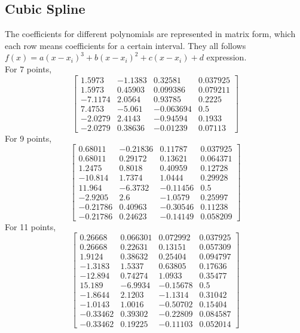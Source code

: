 \documentclass{article}
\newcommand{\bmat}[1]{\begin{bmatrix} #1 \end{bmatrix}}
\begin{document}
\subsection*{Cubic Spline}
The coefficients for different polynomials are represented in matrix form, which each row means coefficients for a certain interval. 
They all follows $f(x) = a(x-x_i)^3 + b(x-x_i)^2 + c(x-x_i) + d$ expression.
\\
For 7 points,
$$\bmat{1.5973    &  -1.1383  &    0.32581  &   0.037925\\
1.5973    &  0.45903   &  0.099386   &  0.079211\\
-7.1174    &   2.0564   &   0.93785   &    0.2225\\
7.4753     &  -5.061  &  -0.063694     &     0.5\\
-2.0279    &   2.4143   &  -0.94594     &  0.1933\\
-2.0279     & 0.38636  &   -0.01239     & 0.07113}$$
For 9 points,
$$\bmat{0.68011   &  -0.21836 &     0.11787   &  0.037925\\
0.68011   &   0.29172    &  0.13621   &  0.064371\\
 1.2475    &   0.8018    &  0.40959   &   0.12728\\
-10.814    &   1.7374    &   1.0444   &   0.29928\\
 11.964    &  -6.3732   &  -0.11456    &      0.5\\
-2.9205    &      2.6   &   -1.0579    &  0.25997\\
-0.21786   &   0.40963  &   -0.30546   &   0.11238\\
-0.21786   &   0.24623  &   -0.14149   &  0.058209}$$
For 11 points,
$$\bmat{ 0.26668  &   0.066301  &   0.072992  &   0.037925\\
0.26668   &   0.22631  &    0.13151  &   0.057309\\
 1.9124   &   0.38632  &    0.25404  &   0.094797\\
-1.3183   &    1.5337  &    0.63805  &    0.17636\\
-12.894   &   0.74274  &     1.0933  &    0.35477\\
 15.189   &   -6.9934  &   -0.15678  &        0.5\\
-1.8644   &    2.1203  &    -1.1314  &    0.31042\\
-1.0143   &    1.0016  &   -0.50702  &    0.15404\\
-0.33462  &    0.39302 &    -0.22809 &    0.084587\\
-0.33462  &    0.19225 &    -0.11103 &    0.052014}$$
\end{document}
